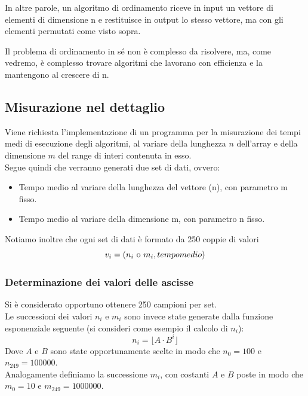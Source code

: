 \documentclass{article}
\begin{document}
        In altre parole, un algoritmo di ordinamento riceve in input un vettore di elementi di dimensione n e restituisce in output lo stesso vettore, ma con gli elementi permutati come visto sopra.
        
        Il problema di ordinamento in sé non è complesso da risolvere, ma, come vedremo, è complesso trovare algoritmi che lavorano con efficienza e la mantengono al crescere di n.

    \subsection{Misurazione nel dettaglio}
        Viene richiesta l'implementazione di un programma per la misurazione dei tempi medi di esecuzione degli algoritmi, al variare della lunghezza $n$ dell'array e della dimensione $m$ del range di interi contenuta in esso.\\

        Segue quindi che verranno generati due set di dati, ovvero:
        \begin{itemize}
            \item Tempo medio al variare della lunghezza del vettore (n), con parametro m fisso.
            \item Tempo medio al variare della dimensione m, con parametro n fisso.
        \end{itemize}
        
        Notiamo inoltre che ogni set di dati è formato da 250 coppie di valori
        $$v_i = (n_i\text{ o }m_i, tempo\space medio)$$

        \subsubsection{Determinazione dei valori delle ascisse}
            Si è considerato opportuno ottenere 250 campioni per set.\\
    
            Le successioni dei valori $n_i$ e $m_i$ sono invece state generate dalla funzione esponenziale seguente (si consideri come esempio il calcolo di $n_i$):
            $$n_i=\lfloor A\cdot B^i\rfloor$$
            Dove $A$ e $B$ sono state opportunamente scelte in modo che $n_0=100$ e $n_{249}=100000$.\\
    
            Analogamente definiamo la successione $m_i$, con costanti $A$ e $B$ poste in modo che $m_0=10$ e $m_{249}=1000000$.
\end{document}
